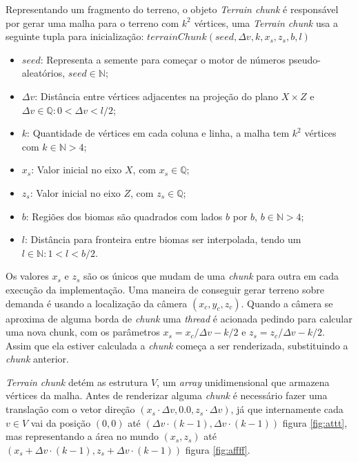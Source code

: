 Representando um fragmento do terreno, o objeto \textit{Terrain chunk} é responsável
por gerar uma malha para o terreno com $k^2$ vértices, uma \textit{Terrain chunk} usa
a seguinte tupla para inicialização: 
$terrainChunk(seed, \Delta{v}, k, x_{s}, z_{s}, b, l)$
\begin{itemize}
    \item $seed$: Representa a semente para começar o motor de números
    pseudo-aleatórios, $seed \in \mathbb{N}$;
    \item $\Delta{v}$: Distância entre vértices adjacentes na
    projeção do plano $X \times Z$ e $\Delta{v} \in \mathbb{Q}:0 < \Delta{v} < l/2$;
    \item $k$: Quantidade de vértices em cada coluna e 
    linha, a malha tem $k^2$ vértices com $k \in \mathbb{N}>4$;
    \item $x_{s}$: Valor inicial no eixo $X$, com $x_{s} \in \mathbb{Q}$;
    \item $z_{s}$: Valor inicial no eixo $Z$, com $z_{s} \in \mathbb{Q}$;
    \item $b$: Regiões dos biomas são quadrados com lados $b$ por $b$, $b \in \mathbb{N}>4$;
    \item $l$: Distância para fronteira entre biomas ser interpolada, tendo um $l \in \mathbb{N}:1 < l < b/2$.
\end{itemize}


Os valores $x_{s}$ e $z_{s}$ são os únicos 
que mudam de uma \textit{chunk} para outra em cada execução da implementação.
Uma maneira de conseguir gerar terreno sobre demanda
é usando a localização da câmera $(x_{c}, y_{c}, z_{c})$. Quando a câmera se
aproxima de alguma borda de \textit{chunk} 
uma \textit{thread} é acionada pedindo para calcular uma nova chunk, com os parâmetros
$x_{s} = x_{c}/\Delta{v} - k/2$ e $z_{s} = z_{c}/\Delta{v} - k/2$. Assim que ela
estiver calculada a \textit{chunk} começa a ser renderizada, substituindo a \textit{chunk} anterior.

\textit{Terrain chunk} detém as estrutura $V$, um \textit{array} unidimensional que armazena
vértices da malha.
Antes de renderizar alguma \textit{chunk} é necessário fazer uma translação com o vetor direção 
$(x_{s} \cdot \Delta{v}, 0.0, z_{s} \cdot \Delta{v})$, já que internamente cada $v \in V$ vai 
da posição $(0, 0)$ até $(\Delta{v} \cdot (k-1), \Delta{v} \cdot (k-1))$ figura \ref{fig:attt}, mas representando a área 
no mundo $(x_{s}, z_{s})$ até $(x_{s} + \Delta{v} \cdot (k-1), z_{s} + \Delta{v} \cdot (k-1))$ figura \ref{fig:affff}.

